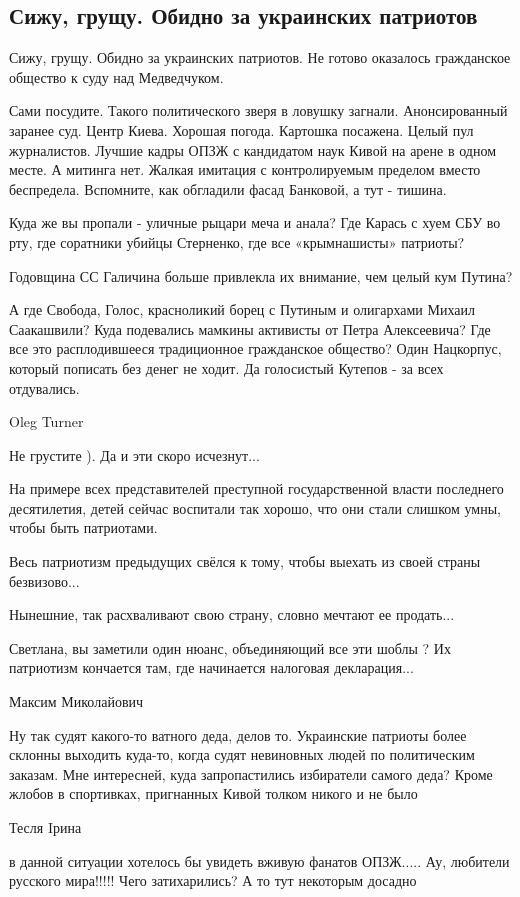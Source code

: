  
 
 
 
 
\subsection{Сижу, грущу. Обидно за украинских патриотов}

Сижу, грущу. Обидно за украинских патриотов. Не готово оказалось гражданское общество к суду над Медведчуком. 

Сами посудите. Такого политического зверя в ловушку загнали. Анонсированный
заранее суд. Центр Киева. Хорошая погода. Картошка посажена. Целый пул
журналистов. Лучшие кадры ОПЗЖ с кандидатом наук Кивой на арене в одном месте.
А митинга нет. Жалкая имитация с контролируемым пределом вместо беспредела.
Вспомните, как обгладили фасад Банковой, а тут - тишина. 

Куда же вы пропали - уличные рыцари меча и анала? Где Карась с хуем СБУ во рту,
где соратники убийцы Стерненко, где все «крымнашисты» патриоты? 

Годовщина СС Галичина больше привлекла их внимание, чем целый кум Путина? 

А где Свобода, Голос, красноликий борец с Путиным и олигархами Михаил
Саакашвили? Куда подевались мамкины активисты от Петра Алексеевича? Где все это
расплодившееся традиционное гражданское общество? Один Нацкорпус, который
пописать без денег не ходит. Да голосистый Кутепов - за всех отдувались.

Oleg Turner

Не грустите ). Да и эти скоро исчезнут...

На примере всех представителей преступной государственной власти последнего
десятилетия, детей сейчас воспитали так хорошо, что они стали слишком умны,
чтобы быть патриотами.

Весь патриотизм предыдущих свёлся к тому, чтобы выехать из своей страны безвизово...

Нынешние, так расхваливают свою страну, словно мечтают ее продать...

Светлана, вы заметили один нюанс, объединяющий все эти шоблы ? Их патриотизм
кончается там, где начинается налоговая декларация... 

Максим Миколайович

Ну так судят какого-то ватного деда, делов то. Украинские патриоты более
склонны выходить куда-то, когда судят невиновных людей по политическим заказам.
Мне интересней, куда запропастились избиратели самого деда? Кроме жлобов в
спортивках, пригнанных Кивой толком никого и не было

Тесля Iрина

в данной ситуации хотелось бы увидеть вживую фанатов ОПЗЖ..... Ау, любители
русского мира!!!!! Чего затихарились? А то тут некоторым досадно
